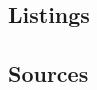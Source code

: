 \documentclass[12pt]{article}
\begin{document}
\subsection{Listings}
\label{subsec:listings}
\begingroup
\renewcommand{\section}[2]{}
\lstlistoflistings
\endgroup

\subsection{Sources}
\label{subsec:sources}
\begingroup
\renewcommand{\section}[2]{}


\endgroup
\end{document}

